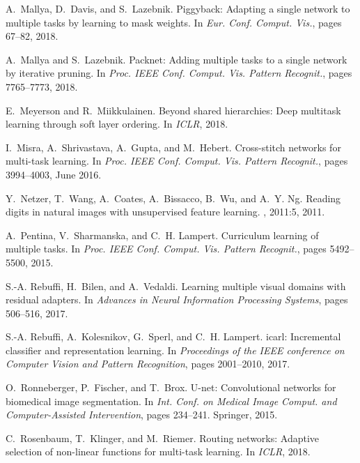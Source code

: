 \documentclass[10pt,twocolumn,letterpaper]{article}
\begin{document}
{\begin{thebibliography}{10}
A.~Mallya, D.~Davis, and S.~Lazebnik.
\newblock Piggyback: Adapting a single network to multiple tasks by learning to
  mask weights.
\newblock In {\em Eur. Conf. Comput. Vis.}, pages 67--82, 2018.

A.~Mallya and S.~Lazebnik.
\newblock Packnet: Adding multiple tasks to a single network by iterative
  pruning.
\newblock In {\em Proc. IEEE Conf. Comput. Vis. Pattern Recognit.}, pages
  7765--7773, 2018.

E.~Meyerson and R.~Miikkulainen.
\newblock Beyond shared hierarchies: Deep multitask learning through soft layer
  ordering.
\newblock In {\em ICLR}, 2018.

I.~Misra, A.~Shrivastava, A.~Gupta, and M.~Hebert.
\newblock Cross-stitch networks for multi-task learning.
\newblock In {\em Proc. IEEE Conf. Comput. Vis. Pattern Recognit.}, pages
  3994--4003, June 2016.

Y.~Netzer, T.~Wang, A.~Coates, A.~Bissacco, B.~Wu, and A.~Y. Ng.
\newblock Reading digits in natural images with unsupervised feature learning.
, 2011:5, 2011.

A.~Pentina, V.~Sharmanska, and C.~H. Lampert.
\newblock Curriculum learning of multiple tasks.
\newblock In {\em Proc. IEEE Conf. Comput. Vis. Pattern Recognit.}, pages
  5492--5500, 2015.

S.-A. Rebuffi, H.~Bilen, and A.~Vedaldi.
\newblock Learning multiple visual domains with residual adapters.
\newblock In {\em Advances in Neural Information Processing Systems}, pages
  506--516, 2017.

S.-A. Rebuffi, A.~Kolesnikov, G.~Sperl, and C.~H. Lampert.
\newblock icarl: Incremental classifier and representation learning.
\newblock In {\em Proceedings of the IEEE conference on Computer Vision and
  Pattern Recognition}, pages 2001--2010, 2017.

O.~Ronneberger, P.~Fischer, and T.~Brox.
\newblock U-net: Convolutional networks for biomedical image segmentation.
\newblock In {\em Int. Conf. on Medical Image Comput. and Computer-Assisted
  Intervention}, pages 234--241. Springer, 2015.

C.~Rosenbaum, T.~Klinger, and M.~Riemer.
\newblock Routing networks: Adaptive selection of non-linear functions for
  multi-task learning.
\newblock In {\em ICLR}, 2018.


\end{thebibliography}}
\end{document}
